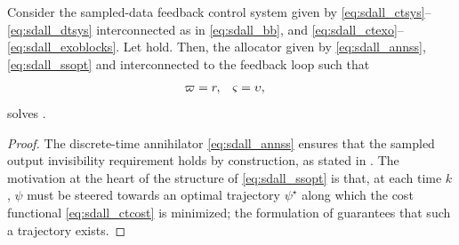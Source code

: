 \begin{theorem}
  \label{thm:sdall_main}
  Consider the sampled-data feedback control system given by \eqref{eq:sdall_ctsys}--\eqref{eq:sdall_dtsys} interconnected as in \eqref{eq:sdall_bb}, and \eqref{eq:sdall_ctexo}--\eqref{eq:sdall_exoblocks}. Let  hold. Then, the allocator given by \eqref{eq:sdall_annss}, \eqref{eq:sdall_ssopt} and interconnected to the feedback loop such that
  \begin{align}
    \label{eq:sdall_thm_interconn}
    \varpi &= r, & \varsigma &= \upsilon,
  \end{align}
  solves .\closestatement
\end{theorem}
\begin{proof}
  The discrete-time annihilator \eqref{eq:sdall_annss} ensures that the sampled output invisibility requirement holds by construction, as stated in . The motivation at the heart of the structure of \eqref{eq:sdall_ssopt} is that, at each time $k$, $\psi$ must be steered towards an optimal trajectory $\psi^\star$ along which the cost functional \eqref{eq:sdall_ctcost} is minimized; the formulation of  guarantees that such a trajectory exists.


\end{proof}
